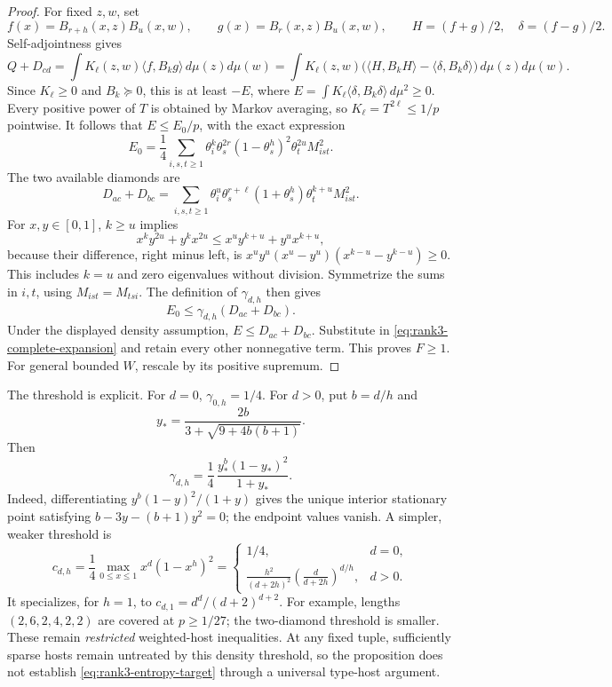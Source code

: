 \begin{proof}
For fixed $z,w$, set
\[
 f(x)=B_{r+h}(x,z)B_u(x,w),\qquad
 g(x)=B_r(x,z)B_u(x,w),\qquad
 H=(f+g)/2,\quad\delta=(f-g)/2.
\]
Self-adjointness gives
\[
 Q+D_{cd}=\int K_\ell(z,w)\langle f,B_kg\rangle\,d\mu(z)d\mu(w)
 =\int K_\ell(z,w)
   \bigl(\langle H,B_kH\rangle-\langle\delta,B_k\delta\rangle\bigr)
   \,d\mu(z)d\mu(w).
\]
Since $K_\ell\geq0$ and $B_k\succeq0$, this is at least $-E$, where
$E=\int K_\ell\langle\delta,B_k\delta\rangle\,d\mu^2\geq0$.
Every positive power of $T$ is obtained by Markov averaging, so
$K_\ell=T^{2\ell}\leq1/p$ pointwise.  It follows that
$E\leq E_0/p$, with the exact expression
\[
 E_0=\frac14\sum_{i,s,t\geq1}
 \theta_i^k\theta_s^{2r}(1-\theta_s^h)^2
 \theta_t^{2u}M_{ist}^2.
\]
The two available diamonds are
\[
 D_{ac}+D_{bc}
 =\sum_{i,s,t\geq1}\theta_i^u\theta_s^{r+\ell}
       (1+\theta_s^h)\theta_t^{k+u}M_{ist}^2.
\]
For $x,y\in[0,1]$, $k\geq u$ implies
\[
 x^ky^{2u}+y^kx^{2u}
 \leq x^uy^{k+u}+y^ux^{k+u},
\]
because their difference, right minus left, is
$x^uy^u(x^u-y^u)(x^{k-u}-y^{k-u})\geq0$.
This includes $k=u$ and zero eigenvalues without division.
Symmetrize the sums in $i,t$, using $M_{ist}=M_{tsi}$.
The definition of $\gamma_{d,h}$ then gives
\[
 E_0\leq\gamma_{d,h}(D_{ac}+D_{bc}).
\]
Under the displayed density assumption, $E\leq D_{ac}+D_{bc}$.
Substitute in \eqref{eq:rank3-complete-expansion} and retain every other
nonnegative term.  This proves $F\geq1$.
For general bounded $W$, rescale by its positive supremum.
\end{proof}

The threshold is explicit.  For $d=0$, $\gamma_{0,h}=1/4$.
For $d>0$, put $b=d/h$ and
\[
 y_* =\frac{2b}{3+\sqrt{9+4b(b+1)}}.
\]
Then
\[
 \gamma_{d,h}=\frac14\,
       \frac{y_*^b(1-y_*)^2}{1+y_*}.
\]
Indeed, differentiating $y^b(1-y)^2/(1+y)$ gives the unique interior
stationary point satisfying $b-3y-(b+1)y^2=0$; the endpoint values vanish.
A simpler, weaker threshold is
\[
 c_{d,h}=\frac14\max_{0\leq x\leq1}x^d(1-x^h)^2
 =\begin{cases}
 1/4,&d=0,\\
 \displaystyle\frac{h^2}{(d+2h)^2}
       \left(\frac{d}{d+2h}\right)^{d/h},&d>0.
 \end{cases}
\]
It specializes, for $h=1$, to $c_{d,1}=d^d/(d+2)^{d+2}$.
For example, lengths $(2,6,2,4,2,2)$ are covered at $p\geq1/27$;
the two-diamond threshold is smaller.  These remain \emph{restricted}
weighted-host inequalities.  At any fixed tuple, sufficiently sparse hosts
remain untreated by this density threshold, so the proposition does not establish
\eqref{eq:rank3-entropy-target} through a universal type-host argument.

